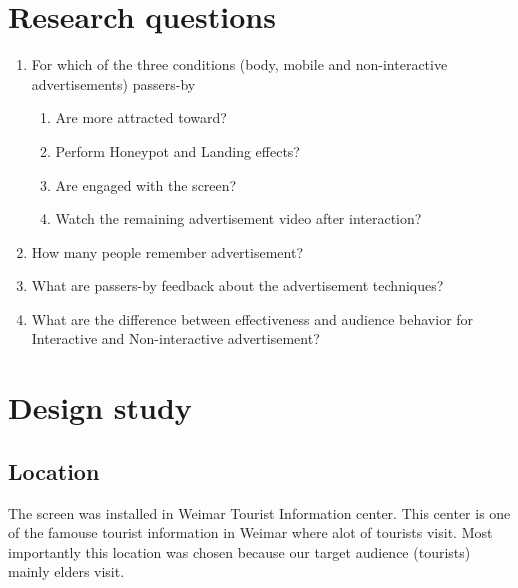 \section{Research questions}
\begin{enumerate}

\item	For which of the three conditions (body, mobile and non-interactive advertisements) passers-by 

\begin{enumerate}
\item	Are more attracted toward?
\item	Perform Honeypot and Landing effects?
\item	Are engaged with the screen?
\item	Watch the remaining advertisement video after interaction?
\end{enumerate}

\item	How many people remember advertisement?
\item	What are passers-by feedback about the advertisement techniques?
\item	What are the difference between effectiveness and audience behavior for Interactive and Non-interactive advertisement?

\end{enumerate}




\section{Design study}


\subsection{Location}
The screen was installed in Weimar Tourist Information center. This center is one of the famouse tourist information in Weimar where alot of tourists visit. Most importantly this location was chosen because our target audience (tourists) mainly elders visit.

